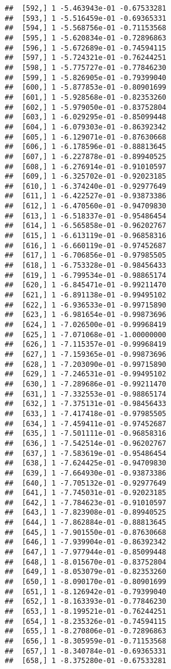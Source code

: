 \documentclass[
  12pt,
]{article}
\begin{document}
\begin{verbatim}
##  [592,] 1 -5.463943e-01 -0.67533281
##  [593,] 1 -5.516459e-01 -0.69365331
##  [594,] 1 -5.568756e-01 -0.71153568
##  [595,] 1 -5.620834e-01 -0.72896863
##  [596,] 1 -5.672689e-01 -0.74594115
##  [597,] 1 -5.724321e-01 -0.76244251
##  [598,] 1 -5.775727e-01 -0.77846230
##  [599,] 1 -5.826905e-01 -0.79399040
##  [600,] 1 -5.877853e-01 -0.80901699
##  [601,] 1 -5.928568e-01 -0.82353260
##  [602,] 1 -5.979050e-01 -0.83752804
##  [603,] 1 -6.029295e-01 -0.85099448
##  [604,] 1 -6.079303e-01 -0.86392342
##  [605,] 1 -6.129071e-01 -0.87630668
##  [606,] 1 -6.178596e-01 -0.88813645
##  [607,] 1 -6.227878e-01 -0.89940525
##  [608,] 1 -6.276914e-01 -0.91010597
##  [609,] 1 -6.325702e-01 -0.92023185
##  [610,] 1 -6.374240e-01 -0.92977649
##  [611,] 1 -6.422527e-01 -0.93873386
##  [612,] 1 -6.470560e-01 -0.94709830
##  [613,] 1 -6.518337e-01 -0.95486454
##  [614,] 1 -6.565858e-01 -0.96202767
##  [615,] 1 -6.613119e-01 -0.96858316
##  [616,] 1 -6.660119e-01 -0.97452687
##  [617,] 1 -6.706856e-01 -0.97985505
##  [618,] 1 -6.753328e-01 -0.98456433
##  [619,] 1 -6.799534e-01 -0.98865174
##  [620,] 1 -6.845471e-01 -0.99211470
##  [621,] 1 -6.891138e-01 -0.99495102
##  [622,] 1 -6.936533e-01 -0.99715890
##  [623,] 1 -6.981654e-01 -0.99873696
##  [624,] 1 -7.026500e-01 -0.99968419
##  [625,] 1 -7.071068e-01 -1.00000000
##  [626,] 1 -7.115357e-01 -0.99968419
##  [627,] 1 -7.159365e-01 -0.99873696
##  [628,] 1 -7.203090e-01 -0.99715890
##  [629,] 1 -7.246531e-01 -0.99495102
##  [630,] 1 -7.289686e-01 -0.99211470
##  [631,] 1 -7.332553e-01 -0.98865174
##  [632,] 1 -7.375131e-01 -0.98456433
##  [633,] 1 -7.417418e-01 -0.97985505
##  [634,] 1 -7.459411e-01 -0.97452687
##  [635,] 1 -7.501111e-01 -0.96858316
##  [636,] 1 -7.542514e-01 -0.96202767
##  [637,] 1 -7.583619e-01 -0.95486454
##  [638,] 1 -7.624425e-01 -0.94709830
##  [639,] 1 -7.664930e-01 -0.93873386
##  [640,] 1 -7.705132e-01 -0.92977649
##  [641,] 1 -7.745031e-01 -0.92023185
##  [642,] 1 -7.784623e-01 -0.91010597
##  [643,] 1 -7.823908e-01 -0.89940525
##  [644,] 1 -7.862884e-01 -0.88813645
##  [645,] 1 -7.901550e-01 -0.87630668
##  [646,] 1 -7.939904e-01 -0.86392342
##  [647,] 1 -7.977944e-01 -0.85099448
##  [648,] 1 -8.015670e-01 -0.83752804
##  [649,] 1 -8.053079e-01 -0.82353260
##  [650,] 1 -8.090170e-01 -0.80901699
##  [651,] 1 -8.126942e-01 -0.79399040
##  [652,] 1 -8.163393e-01 -0.77846230
##  [653,] 1 -8.199521e-01 -0.76244251
##  [654,] 1 -8.235326e-01 -0.74594115
##  [655,] 1 -8.270806e-01 -0.72896863
##  [656,] 1 -8.305959e-01 -0.71153568
##  [657,] 1 -8.340784e-01 -0.69365331
##  [658,] 1 -8.375280e-01 -0.67533281

\end{verbatim}
\end{document}
